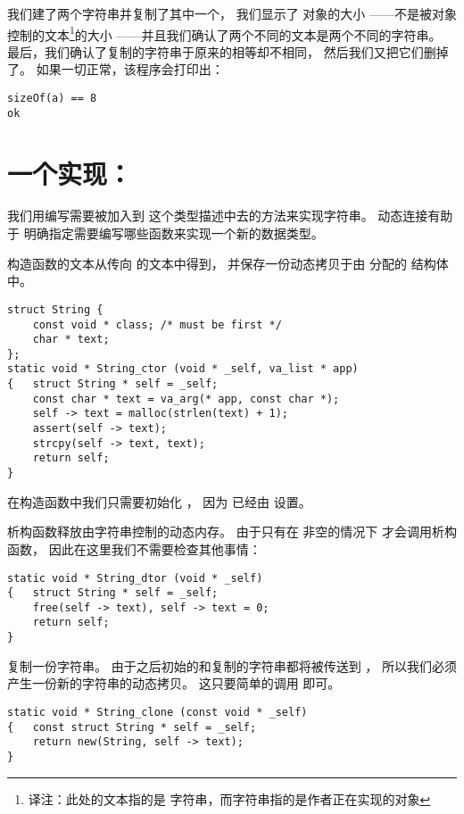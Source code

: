 我们建了两个字符串并复制了其中一个，
我们显示了  对象的大小
——不是被对象控制的文本\footnote{
    译注：此处的文本指的是  字符串，而字符串指的是作者正在实现的对象
}的大小
——并且我们确认了两个不同的文本是两个不同的字符串。
最后，我们确认了复制的字符串于原来的相等却不相同，
然后我们又把它们删掉了。
如果一切正常，该程序会打印出：

\begin{lstlisting}
sizeOf(a) == 8
ok
\end{lstlisting}

\section{一个实现：}
\label{sec:string}

我们用编写需要被加入到  这个类型描述中去的方法来实现字符串。
动态连接有助于 明确指定需要编写哪些函数来实现一个新的数据类型。

构造函数的文本从传向  的文本中得到，
并保存一份动态拷贝于由  分配的  结构体中。

\begin{lstlisting}
struct String {
    const void * class; /* must be first */
    char * text;
};
static void * String_ctor (void * _self, va_list * app)
{   struct String * self = _self;
    const char * text = va_arg(* app, const char *);
    self -> text = malloc(strlen(text) + 1);
    assert(self -> text);
    strcpy(self -> text, text);
    return self;
}
\end{lstlisting}

在构造函数中我们只需要初始化 ，
因为  已经由  设置。

析构函数释放由字符串控制的动态内存。
由于只有在  非空的情况下  才会调用析构函数，
因此在这里我们不需要检查其他事情：
\begin{lstlisting}
static void * String_dtor (void * _self)
{   struct String * self = _self;
    free(self -> text), self -> text = 0;
    return self;
}
\end{lstlisting}

 复制一份字符串。
由于之后初始的和复制的字符串都将被传送到 ，
所以我们必须产生一份新的字符串的动态拷贝。
这只要简单的调用  即可。
\begin{lstlisting}
static void * String_clone (const void * _self)
{   const struct String * self = _self;
    return new(String, self -> text);
}
\end{lstlisting}

